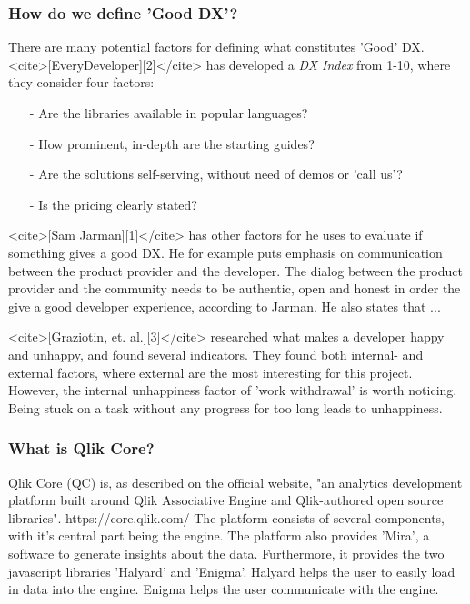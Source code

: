 \documentclass[11pt]{article}
\begin{document}
\begin{multicols}{2}
        \subsubsection{How do we define 'Good DX'?}

        There are many potential factors for defining what constitutes 'Good'
        DX. <cite>[EveryDeveloper][2]</cite> has developed a \textit{DX Index} from
        1-10, where they consider four factors:

        \begin{itemize}
        \item[-] Are the libraries available in popular languages?
        \item[-] How prominent, in-depth are the starting guides?
        \item[-] Are the solutions self-serving, without need of demos or 'call us'?
        \item[-] Is the pricing clearly stated?
        \end{itemize}
        <cite>[Sam Jarman][1]</cite> has other factors for he uses to evaluate
        if something gives a good DX. He for example puts emphasis on
        communication between the product provider and the developer. The dialog
        between the product provider and the community needs to be authentic,
        open and honest in order the give a good developer experience, according
        to Jarman. He also states that ...

        <cite>[Graziotin, et. al.][3]</cite> researched what makes a developer
        happy and unhappy, and found several indicators. They found both
        internal- and external factors, where external are the most interesting
        for this project. However, the internal unhappiness factor of 'work
        withdrawal' is worth noticing. Being stuck on a task without any
        progress for too long leads to unhappiness.

        \subsubsection{What is Qlik Core?}

        Qlik Core (QC) is, as described on the official website, "an analytics
        development platform built around Qlik Associative Engine and
        Qlik-authored open source libraries". https://core.qlik.com/ The
        platform consists of several components, with it's central part being
        the engine. The platform also provides 'Mira', a software to generate
        insights about the data. Furthermore, it provides the two javascript
        libraries 'Halyard' and 'Enigma'. Halyard helps the user to easily load
        in data into the engine. Enigma helps the user communicate with the
        engine.


\end{multicols}
\end{document}
